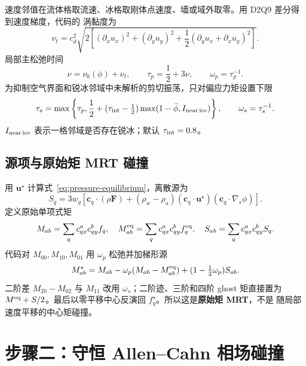 \documentclass[UTF8,zihao=-4]{ctexart}
\newcommand{\vect}[1]{\boldsymbol{#1}}
\numberwithin{equation}{section}
\begin{document}
速度邻值在流体格取流速、冰格取刚体点速度、墙或域外取零。用 D2Q9 差分得到速度梯度，代码的
涡黏度为
\begin{equation}
  \nu_t=c_d^2\sqrt{2\left[(\partial_xu_x)^2+(\partial_yu_y)^2
  +\frac12(\partial_yu_x+\partial_xu_y)^2\right]}.
  \label{eq:eddy-viscosity}
\end{equation}
局部主松弛时间
\begin{equation}
  \nu=\nu_0(\phi)+\nu_t,
  \qquad \tau_p=\frac12+3\nu,
  \qquad \omega_p=\tau_p^{-1}.
\end{equation}
为抑制空气界面和锐冰邻域中未解析的剪切振荡，只对偏应力矩设置下限
\begin{equation}
  \tau_s=\max\left\{\tau_p,
  \frac12+(\tau_{\rm int}-\tfrac12)
  \max(1-\bar\phi,I_{\rm near\,ice})\right\},
  \qquad \omega_s=\tau_s^{-1}.
  \label{eq:shear-floor}
\end{equation}
$I_{\rm near\,ice}$ 表示一格邻域是否存在锐冰；默认 $\tau_{\rm int}=0.8$。

\subsection{源项与原始矩 MRT 碰撞}

用 $\vect u^\star$ 计算式~\eqref{eq:pressure-equilibrium}，离散源为
\begin{equation}
  S_q=3w_q\left[
  \vect c_q\cdot(\rho\vect F)
  +(\rho_w-\rho_a)(\vect c_q\cdot\vect u^\star)
  (\vect c_q\cdot\nabla_s\phi)
  \right].
  \label{eq:momentum-source}
\end{equation}
定义原始单项式矩
\begin{equation}
  M_{ab}=\sum_qc_{qx}^ac_{qy}^bf_q,
  \quad M_{ab}^{\rm eq}=\sum_qc_{qx}^ac_{qy}^bf_q^{\rm eq},
  \quad S_{ab}=\sum_qc_{qx}^ac_{qy}^bS_q.
\end{equation}
代码对 $M_{00},M_{10},M_{01}$ 用 $\omega_p$ 松弛并加梯形源
\begin{equation}
  M_{ab}^\star=M_{ab}-\omega_p(M_{ab}-M_{ab}^{\rm eq})
  +(1-\tfrac12\omega_p)S_{ab}.
  \label{eq:raw-moment-relaxation}
\end{equation}
二阶差 $M_{20}-M_{02}$ 与 $M_{11}$ 改用 $\omega_s$；二阶迹、三阶和四阶 ghost 矩直接置为
$M^{\rm eq}+S/2$。最后以零平移中心反演回 $f_q^\star$。所以这是\textbf{原始矩 MRT}，不是
随局部速度平移的中心矩碰撞。

\section{步骤二：守恒 Allen--Cahn 相场碰撞}
\end{document}
